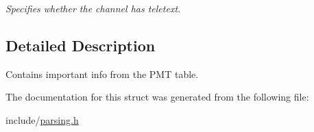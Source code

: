 \begin{DoxyCompactItemize}
\begin{DoxyCompactList}\small\item\em Specifies whether the channel has teletext. \end{DoxyCompactList}\end{DoxyCompactItemize}


\subsection{Detailed Description}
Contains important info from the P\+MT table. 

The documentation for this struct was generated from the following file\+:\begin{DoxyCompactItemize}
\item 
include/\hyperlink{parsing_8h}{parsing.\+h}\end{DoxyCompactItemize}
